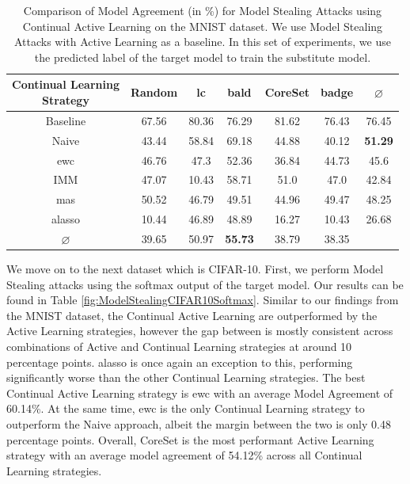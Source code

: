 \begin{table}[h]
    \centering
    \begin{tabular}{c | c c c c c | c} 
        \hline
        \diagbox[width=11em]{Active \\ Learning Strategy}{Continual Learning \\ Strategy} & Random & \gls{lc} & \gls{bald} & CoreSet & \gls{badge} & $\varnothing$ \\ 
        \hline 
        Baseline & 67.56 & 80.36 & 76.29 & 81.62 & 76.43 & 76.45\\
        \hline
        Naive & 43.44 & 58.84 & 69.18 & 44.88 & 40.12 & \textbf{51.29}\\
        \gls{ewc} &  46.76 & 47.3 & 52.36 & 36.84 & 44.73 & 45.6\\
        IMM & 47.07 & 10.43 & 58.71 & 51.0 & 47.0 & 42.84\\
        \gls{mas} & 50.52 & 46.79 & 49.51 & 44.96 & 49.47 & 48.25\\
        \gls{alasso} &  10.44 & 46.89 & 48.89 & 16.27 & 10.43 & 26.68\\
        \hline
        $\varnothing$ & 39.65 & 50.97 & \textbf{55.73} & 38.79 & 38.35\\
        \hline
    \end{tabular}
    \caption{Comparison of Model Agreement (in \%) for Model Stealing Attacks using Continual Active Learning on the MNIST dataset. We use Model Stealing Attacks with Active Learning as a baseline. In this set of experiments,
    we use the predicted label of the target model to train the substitute model.}
    \label{fig:ModelStealingMNISTLabel}
\end{table}

We move on to the next dataset which is CIFAR-10. First, we perform Model Stealing attacks using the softmax output of the target model. Our results can be found in Table \ref{fig:ModelStealingCIFAR10Softmax}. Similar to our findings from the MNIST dataset, the Continual Active Learning
are outperformed by the Active Learning strategies, however the gap between is mostly consistent across combinations of Active and Continual Learning strategies at around 10 percentage points. \gls{alasso} is once again an exception to this, performing significantly worse than the other
Continual Learning strategies. The best Continual Active Learning strategy is \gls{ewc} with an average Model Agreement of 60.14\%. At the same time, \gls{ewc} is the only Continual Learning strategy to outperform the Naive approach, albeit the margin between the two is only 0.48 percentage points.
Overall, CoreSet is the most performant Active Learning strategy with an average model agreement of 54.12\% across all Continual Learning strategies. \par

